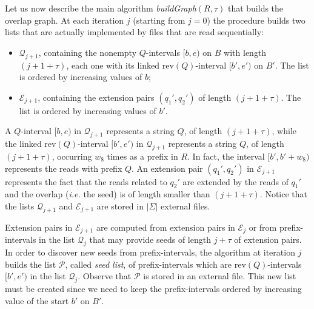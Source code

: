 \documentclass[runningheads,envcountsame,a4paper]{llncs}
\newcommand{\ie}{\textit{i.e.}\xspace}
\newcommand{\rev}{\ensuremath{\mathrm{rev}}}
\begin{document}
Let us now describe the main algorithm  \emph{buildGraph$(R, \tau)$} that
builds the overlap graph.
At each iteration $j$ (starting from $j=0$) the procedure builds  two  lists
that are actually implemented by files that are read sequentially:

\begin{itemize}[noitemsep,topsep=1pt,parsep=1pt,partopsep=1pt]
\item $\mathcal{Q}_{j+1}$, containing the nonempty $Q$-intervals $[b, e)$ on $B$ with length $(j+ 1 + \tau)$,
each one with its linked
  $\rev(Q)$-interval $[b', e')$ on $B'$. The list is  ordered by increasing values of $b$;
\item $\mathcal{E}_{j +1}$, containing the extension pairs $(q_{1}', q_{2}')$ of
  length $(j+1 +\tau)$.  The list is ordered by increasing values of $b'$.

\end{itemize}

A $Q$-interval  $[b,e)$ in $\mathcal{Q}_{j+1}$ represents a
string $Q$, of length $(j+1 +\tau)$, while
the linked $\rev(Q)$-interval  $[b',e')$ in $\mathcal{Q}_{j+1}$  represents a
string $Q$, of length $(j+1+ \tau)$, occurring $w_\$$ times as a prefix in $R$.
In fact,   the interval $[b',b'+w_\$)$ represents the reads with prefix $Q$.
An extension pair $(q_{1}', q_{2}')$ in $\mathcal{E}_{j+1}$ represents the fact
that the reads related to $q_{2}'$ are extended by the reads of $q_{1}'$ and the
overlap (\ie the seed) is of length smaller than $(j+1+\tau)$.
Notice that the lists $\mathcal{Q}_{j+1}$ and  $\mathcal{E}_{j+1}$ are stored in $|\Sigma|$ external files.

Extension pairs in $\mathcal{E}_{j+1}$ are computed from extension pairs
in  $\mathcal{E}_{j}$ or from prefix-intervals in the list $\mathcal{Q}_j$ that may
provide seeds of length $j + \tau$ of extension pairs.
In order to discover new seeds from prefix-intervals, the algorithm at iteration
$j$  builds the list $\mathcal{P}$, called {\em seed list},  of prefix-intervals  which are $\rev(Q)$-intervals $[b', e')$ in the list $\mathcal{Q}_j$. Observe that  $\mathcal{P}$   is  stored in an external file.
This new list must be created since we need to keep the prefix-intervals ordered by
increasing value of the start $b'$ on $B'$.
\end{document}
